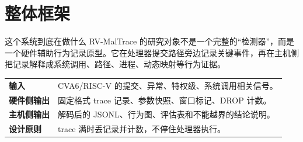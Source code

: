 \documentclass[aspectratio=169,10pt]{beamer}
\begin{document}
\section{整体框架}

\begin{frame}{这个系统到底在做什么}
  \vskip0.1cm
  RV-MalTrace 的研究对象不是一个完整的“检测器”，而是一个\alert{硬件辅助行为记录原型}。它在处理器提交路径旁边记录关键事件，再在主机侧把记录解释成系统调用、路径、进程、动态映射等行为证据。

  \vskip0.25cm
  \begin{center}
  \renewcommand{\arraystretch}{1.20}
  \begin{tabularx}{0.92\linewidth}{@{}L{2.8cm}Y@{}}
    \toprule
    \textbf{输入} & CVA6/RISC-V 的提交、异常、特权级、系统调用相关信号。 \\
    \textbf{硬件侧输出} & 固定格式 trace 记录、参数快照、窗口标记、DROP 计数。 \\
    \textbf{主机侧输出} & 解码后的 JSONL、行为图、评估表和不能越界的结论说明。 \\
    \textbf{设计原则} & trace 满时丢记录并计数，不停住处理器执行。 \\
    \bottomrule
  \end{tabularx}
  \end{center}
\end{frame}
\end{document}
